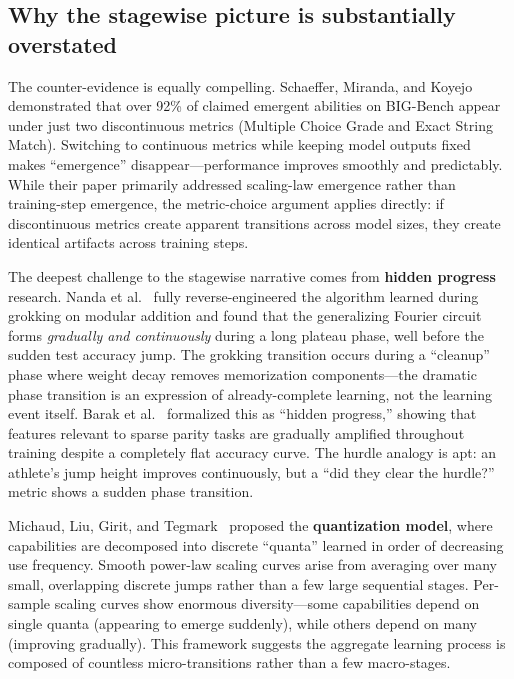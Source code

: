 \documentclass{article}
\theoremstyle{definition}
\begin{document}
\subsection{Why the stagewise picture is substantially overstated}

The counter-evidence is equally compelling. Schaeffer, Miranda, and Koyejo~\cite{schaeffer2023mirage} demonstrated that over 92\% of claimed emergent abilities on BIG-Bench appear under just two discontinuous metrics (Multiple Choice Grade and Exact String Match). Switching to continuous metrics while keeping model outputs fixed makes ``emergence'' disappear---performance improves smoothly and predictably. While their paper primarily addressed scaling-law emergence rather than training-step emergence, the metric-choice argument applies directly: if discontinuous metrics create apparent transitions across model sizes, they create identical artifacts across training steps.

The deepest challenge to the stagewise narrative comes from \textbf{hidden progress} research. Nanda et al.~\cite{nanda2023progress} fully reverse-engineered the algorithm learned during grokking on modular addition and found that the generalizing Fourier circuit forms \emph{gradually and continuously} during a long plateau phase, well before the sudden test accuracy jump. The grokking transition occurs during a ``cleanup'' phase where weight decay removes memorization components---the dramatic phase transition is an expression of already-complete learning, not the learning event itself. Barak et al.~\cite{barak2022hidden} formalized this as ``hidden progress,'' showing that features relevant to sparse parity tasks are gradually amplified throughout training despite a completely flat accuracy curve. The hurdle analogy is apt: an athlete's jump height improves continuously, but a ``did they clear the hurdle?'' metric shows a sudden phase transition.

Michaud, Liu, Girit, and Tegmark~\cite{michaud2023quantization} proposed the \textbf{quantization model}, where capabilities are decomposed into discrete ``quanta'' learned in order of decreasing use frequency. Smooth power-law scaling curves arise from averaging over many small, overlapping discrete jumps rather than a few large sequential stages. Per-sample scaling curves show enormous diversity---some capabilities depend on single quanta (appearing to emerge suddenly), while others depend on many (improving gradually). This framework suggests the aggregate learning process is composed of countless micro-transitions rather than a few macro-stages.
\end{document}
